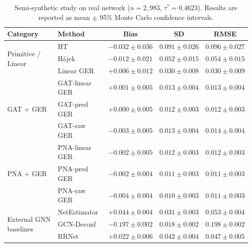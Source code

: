 \documentclass[twoside]{article}
\theoremstyle{plain}
\theoremstyle{definition}
\theoremstyle{remark}
\begin{document}
\begin{table}[t]
\centering
\caption{Semi-synthetic study on real network ($n=2{,}983$, $\tau^* = 0.4623$).
Results are reported as mean $\pm$ 95\% Monte Carlo confidence intervals.}
\small
\begin{tabular}{llccc}
\toprule
Category & Method & Bias & SD & RMSE \\
\midrule
\multirow{3}{*}{Primitive / Linear}
& HT
& $-0.032 \pm 0.036$
& $0.091 \pm 0.026$
& $0.096 \pm 0.027$ \\
& H\'{a}jek
& $-0.012 \pm 0.021$
& $0.052 \pm 0.015$
& $0.054 \pm 0.015$ \\
& Linear GER
& $+0.006 \pm 0.012$
& $0.030 \pm 0.008$
& $0.030 \pm 0.009$ \\
\midrule
\multirow{3}{*}{GAT + GER}
& GAT-linear GER
& $+0.001 \pm 0.005$
& $0.013 \pm 0.004$
& $0.013 \pm 0.004$ \\
& GAT-pred GER
& $+0.000 \pm 0.005$
& $0.012 \pm 0.003$
& $0.012 \pm 0.003$ \\
& GAT-raw GER
& $-0.003 \pm 0.005$
& $0.013 \pm 0.004$
& $0.014 \pm 0.004$ \\
\midrule
\multirow{3}{*}{PNA + GER}
& PNA-linear GER
& $-0.002 \pm 0.005$
& $0.012 \pm 0.003$
& $0.012 \pm 0.003$ \\
& PNA-pred GER
& $\mathbf{-0.002 \pm 0.004}$
& $\mathbf{0.011 \pm 0.003}$
& $\mathbf{0.011 \pm 0.003}$ \\
& PNA-raw GER
& $-0.004 \pm 0.004$
& $\mathbf{0.010 \pm 0.003}$
& $\mathbf{0.011 \pm 0.003}$ \\
\midrule
\multirow{3}{*}{External GNN baselines}
& NetEstimator
& $+0.044 \pm 0.004$
& $0.031 \pm 0.003$
& $0.053 \pm 0.004$ \\
& GCN-Deconf
& $-0.197 \pm 0.002$
& $0.018 \pm 0.002$
& $0.198 \pm 0.002$ \\
& RRNet
& $+0.022 \pm 0.006$
& $0.042 \pm 0.004$
& $0.047 \pm 0.005$ \\
\bottomrule
\end{tabular}
\label{tab:semi_synthetic_full}
\end{table}
\end{document}
